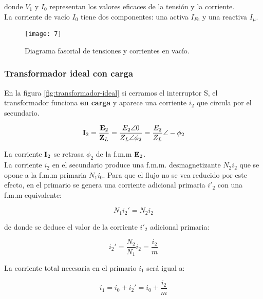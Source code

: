 donde $V_{1}$ y $I_{0}$ representan los valores eficaces de la tensión y la corriente.\\

La corriente de vacío $I_{0}$ tiene dos componentes: una activa $I_{Fe}$ y una reactiva $I_{\mu}$.

 \begin{figure}[!htbp]
	\centering
	\texttt{[image: 7]}
	\caption{Diagrama fasorial de tensiones y corrientes en vacío.}
	\label{diag:vacio}
\end{figure} 

\subsubsection{Transformador ideal con carga}

En la figura \ref{fig:transformador-ideal} si cerramos el interruptor S, el transformador funciona \textbf{en carga} y aparece una corriente $i_{2}$ que circula por el secundario.

\begin{equation*}
	\fasor{I}_2 = \dfrac{\fasor{e}_2}{\fasor{Z}_L} = \dfrac{E_2 \angle 0}{Z_L \angle \phi_2} = \dfrac{E_2}{Z_L} \angle -\phi_2
\end{equation*}

La corriente $\fasor{i}_2$ se retrasa $\phi_{2}$ de la f.m.m $\fasor{e}_2$. \\


La corriente $i_{2}$ en el secundario produce una f.m.m. desmagnetizante $N_{2}i_{2}$ que se opone a la f.m.m primaria $N_{1}i_{0}$. Para que el flujo no se vea reducido por este efecto, en el primario se genera una corriente adicional primaria $i'_{2}$ con una f.m.m equivalente:

\begin{equation*}
	N_1 i_2'=N_2 i_2
\end{equation*}

de donde se deduce el valor de la corriente $i'_{2}$ adicional primaria:

\begin{equation}
	i_2' = \dfrac{N_2}{N_1} i_2 = \dfrac{i_2}{m}
\end{equation}

La corriente total necesaria en el primario $i_{1}$ será igual a:

\begin{equation*}
	i_1 = i_0 + i_2' = i_0 + \dfrac{i_2}{m}
\end{equation*}

